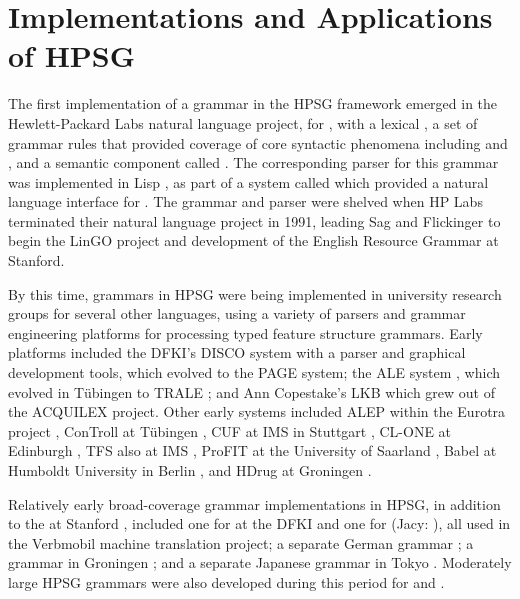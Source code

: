 \documentclass[output=paper]{langsci/langscibook}
\begin{document}
\section{Implementations and Applications of HPSG}

The first implementation of a grammar in the HPSG framework emerged in the Hewlett-Packard Labs natural language project, for , with a lexical  \citep*{FPW85a}, a set of grammar rules that provided coverage of core syntactic phenomena including  and , and a semantic component called  \citep{LaubNerb1991}.  The corresponding parser for this grammar was implemented in Lisp \citep{PP85}, as part of a system called  \citep{NerProud1987} which provided a natural language interface for .  The grammar and parser were shelved when HP Labs terminated their natural language project in 1991, leading Sag and Flickinger to begin the LinGO project and development of the English Resource Grammar at Stanford.

By this time, grammars in HPSG were being implemented in university research groups for several other languages, using a variety of parsers and grammar engineering platforms for processing typed feature structure grammars.  Early platforms included the DFKI's DISCO system \citep{DISCO94} with a parser and graphical development tools, which evolved to the PAGE system; the ALE system \citep{Franz:90,CP96}, which evolved in T{\"u}bingen to TRALE \citep{MPR2002a-u,Penn2004a-u}; and Ann Copestake's LKB \citep{Copestake2002a-Short} which grew out of the ACQUILEX project.  Other early systems included ALEP within the Eurotra project \citep{SimpGron1994}, ConTroll at T{\"u}bingen \citep{GoetzMeurers1997}, CUF at IMS in Stuttgart \citep{DD93a-u}, CL-ONE at Edinburgh \citep{Manandhar1994}, TFS also at IMS \citep{Emele94a-u}, ProFIT at the University of Saarland \citep{Erbach95a}, Babel at Humboldt University in Berlin \citep{Babel}, and HDrug at Groningen \citep{NB97b-u}.  

Relatively early broad-coverage grammar implementations in HPSG, in addition to the  at Stanford \citep{erg}, included one for  at the DFKI \citep{MK2000a} and one for  (Jacy: \citet{Siegel2000a}), all used in the Verbmobil machine translation project; a separate German grammar \citep{Babel,Mueller99a}; a  grammar in Groningen \citep*{BvNM2001a-u}; and a separate Japanese grammar in Tokyo \citep{MNT2005a-u}.  Moderately large HPSG grammars were also developed during this period for  \citep{KY2003a-u} and  \citep*{myk:etal:02}.  
\end{document}
